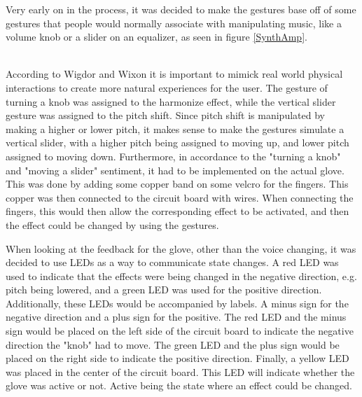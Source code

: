 Very early on in the process, it was decided to make the gestures base off of some gestures that people would normally associate with manipulating music, like a volume knob or a slider on an equalizer, as seen in figure \ref{SynthAmp}.\\

\begin{minipage}{\linewidth}%
\label{SynthAmp}
\end{minipage}\\

According to Wigdor and Wixon it is important to mimick real world physical interactions to create more natural experiences for the user\citep[pp. 47]{Wigdor_2011}. 
The gesture of turning a knob was assigned to the harmonize effect, while the vertical slider gesture was assigned to the pitch shift. Since pitch shift is manipulated by making a higher or lower pitch, it makes sense to make the gestures simulate a vertical slider, with a higher pitch being assigned to moving up, and lower pitch assigned to moving down.
Furthermore, in accordance to the "turning a knob" and "moving a slider" sentiment, it had to be implemented on the actual glove. This was done by adding some copper band on some velcro for the fingers. This copper was then connected to the circuit board with wires. When connecting the fingers, this would then allow the corresponding effect to be activated, and then the effect could be changed by using the gestures.

When looking at the feedback for the glove, other than the voice changing, it was decided to use LEDs as a way to communicate state changes. A red LED was used to indicate that the effects were being changed in the negative direction, e.g. pitch being lowered, and a green LED was used for the positive direction. Additionally, these LEDs would be accompanied by labels. A minus sign for the negative direction and a plus sign for the positive. The red LED and the minus sign would be placed on the left side of the circuit board to indicate the negative direction the "knob" had to move. The green LED and the plus sign would be placed on the right side to indicate the positive direction.
Finally, a yellow LED was placed in the center of the circuit board. This LED will indicate whether the glove was active or not. Active being the state where an effect could be changed.


